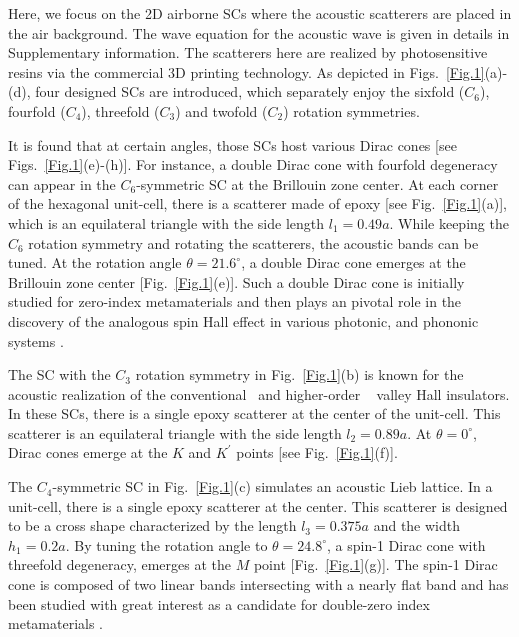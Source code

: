 \documentclass[doublecol]{epl2}
\begin{document}
Here, we focus on the 2D airborne SCs where the acoustic scatterers are placed in the air background. The wave equation for the acoustic wave is given in details in Supplementary information. The scatterers here are realized by photosensitive resins via the commercial 3D printing technology. As depicted in Figs.~\ref{Fig.1}(a)-(d), four designed SCs are introduced, which separately enjoy the sixfold ($C_6$), fourfold ($C_4$), threefold ($C_3$) and twofold ($C_2$) rotation symmetries. 

It is found that at certain angles, those SCs host various Dirac cones [see Figs.~\ref{Fig.1}(e)-(h)]. For instance, a double Dirac cone with fourfold degeneracy can appear in the $C_6$-symmetric SC at the Brillouin zone center. At each corner of the hexagonal unit-cell, there is a scatterer made of epoxy [see Fig.~\ref{Fig.1}(a)], which is an equilateral triangle with the side length $l_1=0.49a$. While keeping the $C_6$ rotation symmetry and rotating the scatterers, the acoustic bands can be tuned. At the rotation angle $\theta=21.6^\circ$, a double Dirac cone emerges at the Brillouin zone center [Fig.~\ref{Fig.1}(e)]. Such a double Dirac cone is initially studied for zero-index metamaterials \cite{sakoda2012double} and then plays an pivotal role in the discovery of the analogous spin Hall effect in various photonic, and phononic systems \cite{wu2015scheme,he2016acoustic}. 

The SC with the $C_3$ rotation symmetry in Fig.~\ref{Fig.1}(b) is known for the acoustic realization of the conventional~\cite{lu2016valley,lu2017observation} and higher-order ~\cite{zhang2021valley} valley Hall insulators. In these SCs, there is a single epoxy scatterer at the center of the unit-cell. This scatterer is an equilateral triangle with the side length $l_2=0.89a$. At $\theta=0^\circ$, Dirac cones emerge at the $K$ and $K^\prime$ points [see Fig.~\ref{Fig.1}(f)]. 

The $C_4$-symmetric SC in Fig.~\ref{Fig.1}(c) simulates an acoustic Lieb lattice. In a unit-cell, there is a single epoxy scatterer at the center. This scatterer is designed to be a cross shape characterized by the length $l_3=0.375a$ and the width $h_1=0.2a$. By tuning the rotation angle to $\theta=24.8^\circ$, a spin-1 Dirac cone with threefold degeneracy, emerges at the $M$ point [Fig.~\ref{Fig.1}(g)]. The spin-1 Dirac cone is composed of two linear bands intersecting with a nearly flat band and has been studied with great interest as a candidate for double-zero index metamaterials \cite{huang2011dirac,chan2012dirac,dubois2017observation,xu2020three,li2021dirac}.
\end{document}
